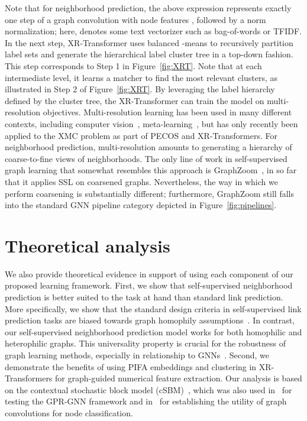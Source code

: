 \documentclass{article} \usepackage{iclr2022_conference,times}
\begin{document}
Note that for neighborhood prediction, the above expression represents exactly one step of a graph convolution with node features , followed by a norm normalization; here,  denotes some text vectorizer such as bag-of-words or TFIDF. In the next step, XR-Transformer uses balanced -means to recursively partition label sets and generate the hierarchical label cluster tree in a top-down fashion. This step corresponds to Step 1 in Figure~\ref{fig:XRT}. Note that at each intermediate level, it learns a matcher to find the most relevant clusters, as illustrated in Step 2 of Figure~\ref{fig:XRT}. By leveraging the label hierarchy defined by the cluster tree, the XR-Transformer can train the model on multi-resolution objectives. Multi-resolution learning has been used in many different contexts, including computer vision~\citep{lai2017deep,karras2017progressive,karras2019style,pedersoli2015coarse}, meta-learning~\citep{liu2019self}, but has only recently been applied to the XMC problem as part of PECOS and XR-Transformers. For neighborhood prediction, multi-resolution amounts to generating a hierarchy of coarse-to-fine views of neighborhoods. The only line of work in self-supervised graph learning that somewhat resembles this approach is GraphZoom~\citep{deng2020graphzoom}, in so far that it applies SSL on coarsened graphs. Nevertheless, the way in which we perform coarsening is substantially different; furthermore, GraphZoom still falls into the standard GNN pipeline category depicted in Figure~\ref{fig:pipelines}.

\vspace{-0.2cm}
\section{Theoretical analysis}
We also provide theoretical evidence in support of using each component of our proposed learning framework. First, we show that self-supervised neighborhood prediction is better suited to the task at hand than standard link prediction. More specifically, we show that the standard design criteria in self-supervised link prediction tasks are biased towards graph homophily assumptions~\citep{mcpherson2001birds,klicpera2018predict}. In contrast, our self-supervised neighborhood prediction model works for both homophilic and heterophilic graphs. This universality property is crucial for the robustness of graph learning methods, especially in relationship to GNNs~\citep{chien2020adaptive}. Second, we demonstrate the benefits of using PIFA embeddings and clustering in XR-Transformers for graph-guided numerical feature extraction. 
Our analysis is based on the contextual stochastic block model (cSBM)~\citep{deshpande2018contextual}, which was also used in~\cite{chien2020adaptive} for testing the GPR-GNN framework and in~\cite{baranwal2021graph} for establishing the utility of graph convolutions for node classification.
\end{document}
